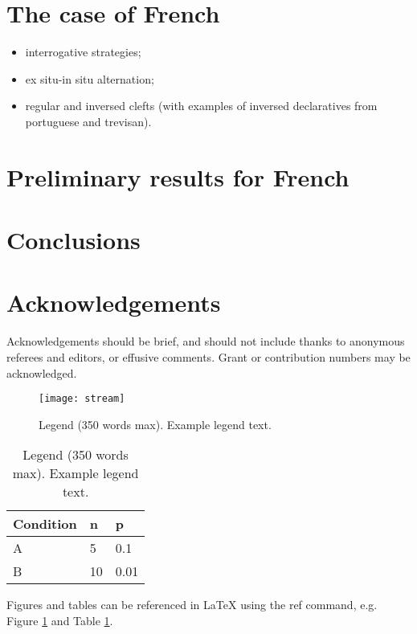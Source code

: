 \documentclass[fleqn,10pt]{wlscirep}
\begin{document}
\section*{The case of French}
\begin{itemize}
    \item interrogative strategies;
    \item ex situ-in situ alternation;
    \item regular and inversed clefts (with examples of inversed declaratives from portuguese and trevisan).
    \end{itemize}

\section*{Preliminary results for French}



\section*{Conclusions}





\section*{Acknowledgements}

Acknowledgements should be brief, and should not include thanks to anonymous referees and editors, or effusive comments. Grant or contribution numbers may be acknowledged.

\begin{figure}[ht]
\centering
\texttt{[image: stream]}
\caption{Legend (350 words max). Example legend text.}
\label{fig:stream}
\end{figure}

\begin{table}[ht]
\centering
\begin{tabular}{|l|l|l|}
\hline
Condition & n & p \\
\hline
A & 5 & 0.1 \\
\hline
B & 10 & 0.01 \\
\hline
\end{tabular}
\caption{\label{tab:example}Legend (350 words max). Example legend text.}
\end{table}

Figures and tables can be referenced in LaTeX using the ref command, e.g. Figure \ref{fig:stream} and Table \ref{tab:example}.
\end{document}
